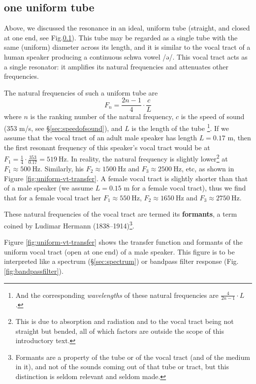 \documentclass[
]{book}
\begin{document}
\subsection{one uniform tube}\label{sec:onetube}

Above, we discussed the resonance in an ideal, uniform tube (straight, and closed at one end, see Fig.\ref{sec:onetube}). This tube may be regarded as a single tube with the same (uniform) diameter across its length, and it is similar to the vocal tract of a human speaker producing a continuous schwa vowel /ə/. This vocal tract acts as a single resonator: it amplifies its natural frequencies and attenuates other frequencies.

The natural frequencies of such a uniform tube are
\[F_n = \frac{2n-1}{4} \cdot \frac{c}{L}\]
where \(n\) is the ranking number of the natural frequency, \(c\) is the speed of sound (353 m/s, see §\ref{sec:speedofsound}), and \(L\) is the length of the tube \citep[139]{Stevens_1998} \footnote{And the corresponding \emph{wavelengths} of these natural frequencies are \(\frac{4}{2n-1}\cdot L\) \citep[60]{Nooteboom_Cohen_1984}.}.
If we assume that the vocal tract of an adult male speaker has length \(L=0.17\) m, then the first resonant frequency of this speaker's vocal tract would be at \(F_1 = \frac{1}{4} \cdot \frac{353}{0.17} = 519\ \textrm{Hz}\). In reality, the natural frequency is slightly lower\footnote{This is due to absorption and radiation and to the vocal tract being not straight but bended, all of which factors are outside the scope of this introductory text.} at \(F_1 \approx 500\ \textrm{Hz}\).
Similarly, his \(F_2 \approx 1500\ \textrm{Hz}\) and \(F_3 \approx 2500\ \textrm{Hz}\), etc, as shown in Figure \ref{fig:uniform-vt-transfer}.
A female vocal tract is slightly shorter than that of a male speaker (we assume \(L=0.15\) m for a female vocal tract), thus we find that for a female vocal tract her \(F_1 \approx 550\ \textrm{Hz}\), \(F_2 \approx 1650\ \textrm{Hz}\) and \(F_3 \approx 2750\ \textrm{Hz}\).

These natural frequencies of the vocal tract are termed its \textbf{formants}, a term coined by Ludimar Hermann (1838--1914)\footnote{Formants are a property of the tube or of the vocal tract (and of the medium in it), and not of the sounds coming out of that tube or tract, but this distinction is seldom relevant and seldom made.}.

Figure \ref{fig:uniform-vt-transfer} shows the transfer function and formants of the uniform vocal tract (open at one end) of a male speaker. This figure is to be interpreted like a spectrum (§\ref{sec:spectrum}) or bandpass filter response (Fig.\ref{fig:bandpassfilter}).
\end{document}
